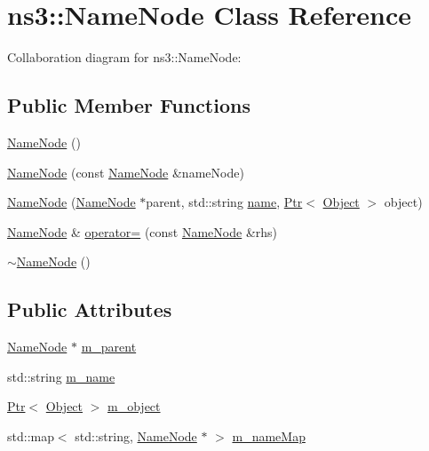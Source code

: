 \hypertarget{classns3_1_1NameNode}{}\section{ns3\+:\+:Name\+Node Class Reference}
\label{classns3_1_1NameNode}


Collaboration diagram for ns3\+:\+:Name\+Node\+:
\subsection*{Public Member Functions}
\begin{DoxyCompactItemize}
\item 
\hyperlink{classns3_1_1NameNode_a8e51a2fe672cdd0dd068e5e8c6f28bc3}{Name\+Node} ()
\item 
\hyperlink{classns3_1_1NameNode_a02268dbe865f3e94cfa24d7bd0d37faf}{Name\+Node} (const \hyperlink{classns3_1_1NameNode}{Name\+Node} \&name\+Node)
\item 
\hyperlink{classns3_1_1NameNode_a12a6a785591a3764afc6c4fd49f6b26b}{Name\+Node} (\hyperlink{classns3_1_1NameNode}{Name\+Node} $\ast$parent, std\+::string \hyperlink{generate__test__data__lte__spectrum__model_8m_ab74e6bf80237ddc4109968cedc58c151}{name}, \hyperlink{classns3_1_1Ptr}{Ptr}$<$ \hyperlink{classns3_1_1Object}{Object} $>$ object)
\item 
\hyperlink{classns3_1_1NameNode}{Name\+Node} \& \hyperlink{classns3_1_1NameNode_acca33903d6d50fe24cb3a5b3b905dc97}{operator=} (const \hyperlink{classns3_1_1NameNode}{Name\+Node} \&rhs)
\item 
\hyperlink{classns3_1_1NameNode_a899839e0c816e612b22ea10a9a698f18}{$\sim$\+Name\+Node} ()
\end{DoxyCompactItemize}
\subsection*{Public Attributes}
\begin{DoxyCompactItemize}
\item 
\hyperlink{classns3_1_1NameNode}{Name\+Node} $\ast$ \hyperlink{classns3_1_1NameNode_a2c5fdd9118e10047488a9967428d9474}{m\+\_\+parent}
\item 
std\+::string \hyperlink{classns3_1_1NameNode_ae028fe25bbe0bde5cbe82a79a260acb9}{m\+\_\+name}
\item 
\hyperlink{classns3_1_1Ptr}{Ptr}$<$ \hyperlink{classns3_1_1Object}{Object} $>$ \hyperlink{classns3_1_1NameNode_ab5417732c84a06149e0820d35bc85a7c}{m\+\_\+object}
\item 
std\+::map$<$ std\+::string, \hyperlink{classns3_1_1NameNode}{Name\+Node} $\ast$ $>$ \hyperlink{classns3_1_1NameNode_a7fc4cf8060a6182da15ba8eb4c265344}{m\+\_\+name\+Map}
\end{DoxyCompactItemize}


